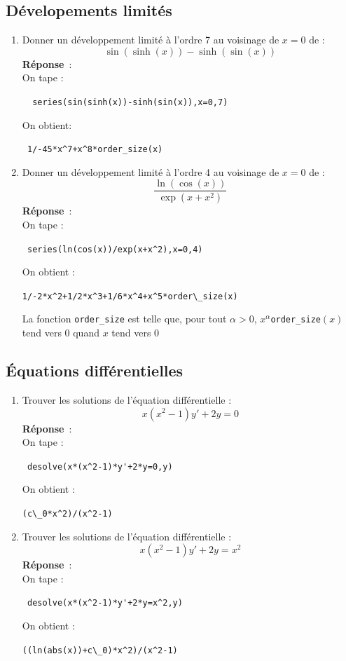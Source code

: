 \documentclass{article}
\begin{document}
\begin{giacjshere}
\subsection{D\'evelopements limit\'es}
\begin{enumerate}
\item Donner un d\'eveloppement limit\'e \`a l'ordre 7 au voisinage de $x=0$
 de :
$$\sin(\sinh(x))-\sinh(\sin(x))$$
{\bf R\'eponse}~:\\
On tape :
\begin{center}
\verb|  series(sin(sinh(x))-sinh(sin(x)),x=0,7)|
\end{center}
On obtient:
\begin{center}
\verb| 1/-45*x^7+x^8*order_size(x)|
\end{center}
\item Donner un d\'eveloppement limit\'e \`a l'ordre 4 au voisinage de $x=0$ 
de :
$$\frac{\ln(\cos(x))}{\exp(x+x^2)}$$
{\bf R\'eponse}~:\\
On tape :
\begin{center}
\verb| series(ln(cos(x))/exp(x+x^2),x=0,4)|
\end{center}
On obtient :
\begin{center}
\verb|1/-2*x^2+1/2*x^3+1/6*x^4+x^5*order\_size(x)|
\end{center}
La fonction \verb|order_size| est telle que, pour tout $\alpha>0$, 
$x^\alpha$\verb|order_size|$(x)$ tend vers 0 quand $x$ tend vers 0 
\end{enumerate}

\subsection{\'Equations diff\'erentielles}
\begin{enumerate}
\item Trouver les solutions de l'\'equation diff\'erentielle :
$$x(x^2-1)y'+2y=0$$
{\bf R\'eponse}~:\\
On tape :
\begin{center}
\verb| desolve(x*(x^2-1)*y'+2*y=0,y)|
\end{center}
On obtient :
\begin{center}
\verb|(c\_0*x^2)/(x^2-1)|
\end{center}

\item Trouver les solutions de l'\'equation diff\'erentielle :
$$x(x^2-1)y'+2y=x^2$$
{\bf R\'eponse}~:\\
On tape :
\begin{center}
\verb| desolve(x*(x^2-1)*y'+2*y=x^2,y)|
\end{center}
On obtient :
\begin{center}
\verb|((ln(abs(x))+c\_0)*x^2)/(x^2-1)|
\end{center}
\end{enumerate}


\end{giacjshere}
\end{document}

